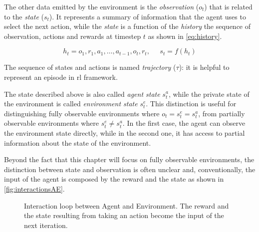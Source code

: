 The other data emitted by the environment is the \textit{observation} ($o_t$) that is related to the \textit{state} ($s_t$). It represents a summary of information that the agent uses to select the next action, while the \textit{state} is a function of the \textit{history} the sequence of observation, actions and rewards at timestep $t$ as shown in \vref{eq:history}.

\begin{equation}\label{eq:history}
h_t = o_1, r_1, a_1, \dots, a_{t-1}, o_{t}, r_t, \;\;\;\;\; s_t = f(h_t)
\end{equation}

The sequence of states and actions is named \textit{trajectory} ($\tau$): it is helpful to represent an episode in \acrfull{rl} framework.

The state described above is also called \textit{agent state} $s_t^a$, while the private state of the environment is called \textit{environment state} $s_t^e$. This distinction is useful for distinguishing fully observable environments where $o_t = s_t^e = s_t^a$, from partially observable environments where $s_t^e \neq s_t^a$.
In the first case, the agent can observe the environment state directly, while in the second one, it has access to partial information about the state of the environment.

Beyond the fact that this chapter will focus on fully observable environments, the distinction between state and observation is often unclear and, conventionally, the input of the agent is composed by the reward and the state as shown in \vref{fig:interactionsAE}.


\begin{figure}
	\centering
	\caption[Interaction loop between Agent and Environment]{Interaction loop between Agent and Environment. The reward and the state resulting from taking an action become the input of the next iteration.}
	\label{fig:interactionsAE}
\end{figure}

